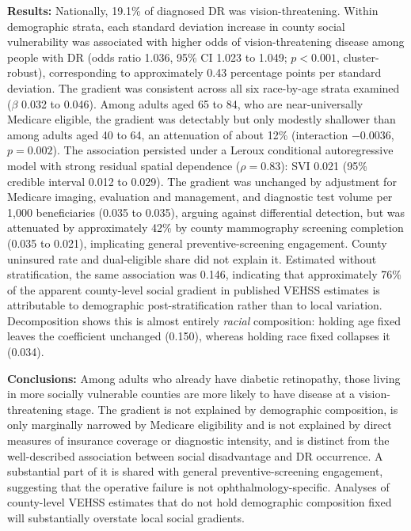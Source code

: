 \documentclass[11pt]{article}
\begin{document}
\noindent\textbf{Results:} Nationally, 19.1\% of diagnosed DR was
vision-threatening. Within demographic strata, each standard deviation increase
in county social vulnerability was associated with higher odds of
vision-threatening disease among people with DR (odds ratio 1.036, 95\% CI 1.023
to 1.049; $p < 0.001$, cluster-robust), corresponding to approximately 0.43 percentage points
per standard deviation. The gradient was consistent across all six race-by-age
strata examined ($\beta$ 0.032 to 0.046). Among adults aged 65 to 84, who are
near-universally Medicare eligible, the gradient was detectably but only
modestly shallower than among adults aged 40 to 64, an attenuation of about
12\% (interaction $-0.0036$, $p = 0.002$). The association persisted under a Leroux
conditional autoregressive model with strong residual spatial dependence
($\rho = 0.83$): SVI 0.021 (95\% credible interval 0.012 to 0.029). The gradient
was unchanged by adjustment for Medicare imaging, evaluation and management, and
diagnostic test volume per 1,000 beneficiaries (0.035 to 0.035), arguing against
differential detection, but was attenuated by approximately 42\% by county
mammography screening completion (0.035 to 0.021), implicating general
preventive-screening engagement. County uninsured rate and dual-eligible share
did not explain it. Estimated without stratification, the same association was
0.146, indicating that approximately 76\% of the apparent county-level social
gradient in published VEHSS estimates is attributable to demographic
post-stratification rather than to local variation. Decomposition shows this is
almost entirely \emph{racial} composition: holding age fixed leaves the
coefficient unchanged (0.150), whereas holding race fixed collapses it (0.034).

\noindent\textbf{Conclusions:} Among adults who already have diabetic
retinopathy, those living in more socially vulnerable counties are more likely
to have disease at a vision-threatening stage. The gradient is not explained by
demographic composition, is only marginally narrowed by Medicare eligibility and
is not explained by direct measures of insurance coverage or diagnostic
intensity, and is distinct
from the well-described association between social disadvantage and DR
occurrence. A substantial part of it is shared with general preventive-screening
engagement, suggesting that the operative failure is not ophthalmology-specific. Analyses of county-level VEHSS estimates that do not hold
demographic composition fixed will substantially overstate local social
gradients.
\end{document}
